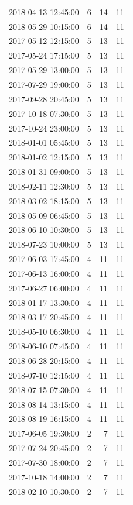 \begin{tabular}{lrrr}
2018-04-13 12:45:00 & 6 & 14 & 11 \\
2018-05-29 10:15:00 & 6 & 14 & 11 \\
2017-05-12 12:15:00 & 5 & 13 & 11 \\
2017-05-24 17:15:00 & 5 & 13 & 11 \\
2017-05-29 13:00:00 & 5 & 13 & 11 \\
2017-07-29 19:00:00 & 5 & 13 & 11 \\
2017-09-28 20:45:00 & 5 & 13 & 11 \\
2017-10-18 07:30:00 & 5 & 13 & 11 \\
2017-10-24 23:00:00 & 5 & 13 & 11 \\
2018-01-01 05:45:00 & 5 & 13 & 11 \\
2018-01-02 12:15:00 & 5 & 13 & 11 \\
2018-01-31 09:00:00 & 5 & 13 & 11 \\
2018-02-11 12:30:00 & 5 & 13 & 11 \\
2018-03-02 18:15:00 & 5 & 13 & 11 \\
2018-05-09 06:45:00 & 5 & 13 & 11 \\
2018-06-10 10:30:00 & 5 & 13 & 11 \\
2018-07-23 10:00:00 & 5 & 13 & 11 \\
2017-06-03 17:45:00 & 4 & 11 & 11 \\
2017-06-13 16:00:00 & 4 & 11 & 11 \\
2017-06-27 06:00:00 & 4 & 11 & 11 \\
2018-01-17 13:30:00 & 4 & 11 & 11 \\
2018-03-17 20:45:00 & 4 & 11 & 11 \\
2018-05-10 06:30:00 & 4 & 11 & 11 \\
2018-06-10 07:45:00 & 4 & 11 & 11 \\
2018-06-28 20:15:00 & 4 & 11 & 11 \\
2018-07-10 12:15:00 & 4 & 11 & 11 \\
2018-07-15 07:30:00 & 4 & 11 & 11 \\
2018-08-14 13:15:00 & 4 & 11 & 11 \\
2018-08-19 16:15:00 & 4 & 11 & 11 \\
2017-06-05 19:30:00 & 2 & 7 & 11 \\
2017-07-24 20:45:00 & 2 & 7 & 11 \\
2017-07-30 18:00:00 & 2 & 7 & 11 \\
2017-10-18 14:00:00 & 2 & 7 & 11 \\
2018-02-10 10:30:00 & 2 & 7 & 11 \\

\end{tabular}
